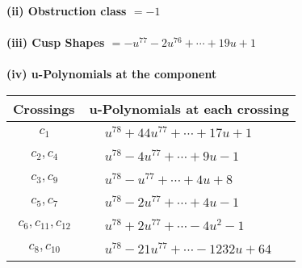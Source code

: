 \documentclass[1p]{elsarticle_modified}
\theoremstyle{definition}
\begin{document}
\flushleft \textbf{(ii) Obstruction class $= -1$}\\~\\
\flushleft \textbf{(iii) Cusp Shapes $= - u^{77}-2 u^{76}+\cdots+19 u+1$}\\~\\
\newpage\renewcommand{\arraystretch}{1}
\flushleft \textbf{(iv) u-Polynomials at the component}\newline \\
\begin{tabular}{m{50pt}|m{274pt}}
Crossings & \hspace{64pt}u-Polynomials at each crossing \\
\hline $$\begin{aligned}c_{1}\end{aligned}$$&$\begin{aligned}
&u^{78}+44 u^{77}+\cdots+17 u+1
\end{aligned}$\\
\hline $$\begin{aligned}c_{2},c_{4}\end{aligned}$$&$\begin{aligned}
&u^{78}-4 u^{77}+\cdots+9 u-1
\end{aligned}$\\
\hline $$\begin{aligned}c_{3},c_{9}\end{aligned}$$&$\begin{aligned}
&u^{78}- u^{77}+\cdots+4 u+8
\end{aligned}$\\
\hline $$\begin{aligned}c_{5},c_{7}\end{aligned}$$&$\begin{aligned}
&u^{78}-2 u^{77}+\cdots+4 u-1
\end{aligned}$\\
\hline $$\begin{aligned}c_{6},c_{11},c_{12}\end{aligned}$$&$\begin{aligned}
&u^{78}+2 u^{77}+\cdots-4 u^2-1
\end{aligned}$\\
\hline $$\begin{aligned}c_{8},c_{10}\end{aligned}$$&$\begin{aligned}
&u^{78}-21 u^{77}+\cdots-1232 u+64
\end{aligned}$\\
\hline
\end{tabular}\\~\\
\end{document}
